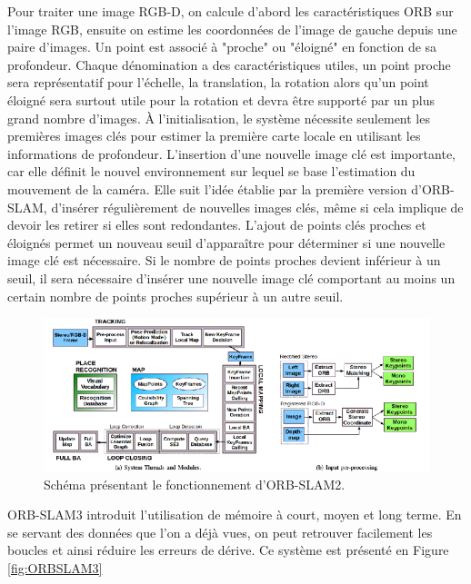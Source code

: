 \documentclass[11pt]{article}
\begin{document}
  Pour traiter une image RGB-D, on calcule d'abord les caractéristiques ORB sur l'image RGB, ensuite on estime les coordonnées de l'image de 
  gauche depuis une paire d'images. Un point est associé à "proche" ou "éloigné" en fonction de sa profondeur. Chaque dénomination a des
  caractéristiques utiles, un point proche sera représentatif pour l'échelle, la translation, la rotation alors qu'un point éloigné
  sera surtout utile pour la rotation et devra être supporté par un plus grand nombre d'images.
  À l'initialisation, le système nécessite seulement les premières images clés pour estimer la première carte locale en utilisant les informations
  de profondeur. 
  L'insertion d'une nouvelle image clé est importante, car elle définit le nouvel environnement sur lequel se base l'estimation du mouvement 
  de la caméra. Elle suit l'idée établie par la première version d'ORB-SLAM, d'insérer régulièrement de nouvelles images clés, 
  même si cela implique de devoir les retirer si elles sont redondantes. L'ajout de points clés proches et éloignés permet un nouveau seuil 
  d'apparaître pour déterminer si une nouvelle image clé est nécessaire. 
  Si le nombre de points proches devient inférieur à un seuil, il sera nécessaire d'insérer une nouvelle image clé comportant au moins un certain
  nombre de points proches supérieur à un autre seuil.

  \begin{figure}[hbt]  
    \includegraphics[width=\textwidth]{ORB_SLAM2.png}    
    \caption{Schéma présentant le fonctionnement d'ORB-SLAM2.}
    \label{fig:ORBSLAM2}
  \end{figure} 

  ORB-SLAM3 introduit l'utilisation de mémoire à court, moyen et long terme. En se servant des données que l'on a déjà vues, on peut retrouver
  facilement les boucles et ainsi réduire les erreurs de dérive. Ce système est présenté en Figure \ref{fig:ORBSLAM3}
\end{document}
